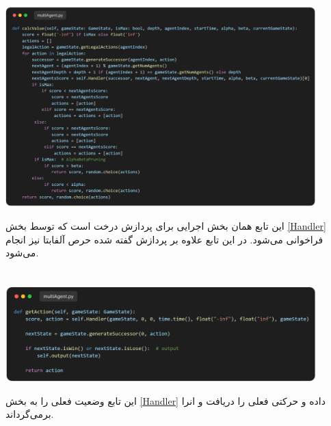\documentclass[12pt, dvipsnames, svgnames, x11names,]{article}
\begin{document}
		
		\subsection{} \label{calcValue}
		
			\begin{center}
				\includegraphics[width=12cm]{images/06}
			\end{center}
		
			{\normalsize این تابع همان بخش اجرایی برای پردازش درخت  است که توسط بخش \ref{Handler} فراخوانی می‌شود. در این تابع علاوه بر پردازش گفته شده حرص آلفابتا  نیز انجام می‌شود.}
	
	
	\section{} \label{getAction}
	
		\begin{center}
			\includegraphics[width=12cm]{images/07}
		\end{center}
		
		{\normalsize این تابع وضعیت فعلی را به بخش \ref{Handler} داده و حرکتی فعلی  را دریافت و انرا برمی‌گرداند.}
		
		
	\section{}
	
\end{document}
